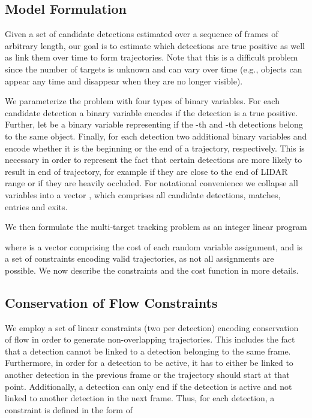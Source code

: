 \documentclass[letterpaper, 10 pt, conference]{ieeeconf}  \pdfminorversion=4
\begin{document}
\subsection{Model Formulation}
\label{sc:structured_model}

Given a set of candidate detections  estimated over a sequence of frames of arbitrary length, our goal is to estimate which detections are true positive as well as link them over time to form trajectories.
Note that this is a difficult problem since  the number of targets is unknown and can vary over time (e.g., objects can appear any time and disappear when they are no longer visible).

We parameterize the problem with four types of binary variables. For each candidate detection  a binary variable   encodes if the detection is a true positive. Further, let  be a binary variable representing  if the -th and -th detections belong to the same object. Finally, for each detection  two additional binary variables  and   encode whether it is the beginning or the end of a trajectory, respectively. This is necessary in order to represent the fact that certain detections are more likely to result in end of trajectory,  for example if they are close to the end of LIDAR range or if they are heavily occluded.
For notational convenience we collapse all  variables  into a vector  , which comprises all candidate detections, matches, entries and exits.

We then formulate the multi-target tracking problem as an integer linear program

where  is a vector comprising the cost of each random variable assignment, and  is a set of constraints encoding valid trajectories, as not all assignments are possible.
We now describe the constraints and the cost function in more details.





\subsection{Conservation of Flow Constraints}
We employ a set of linear constraints (two per detection) encoding  conservation of flow in order to generate non-overlapping trajectories. This includes the fact that a detection cannot be linked to a detection belonging to the same frame. Furthermore, in order for a detection to be active, it has to either be linked to another detection in the previous frame or the trajectory should start at that point. Additionally, a detection can only end if the detection is active and not linked to another detection in the next frame. Thus, for each detection, a constraint is defined in the form of
\end{document}
